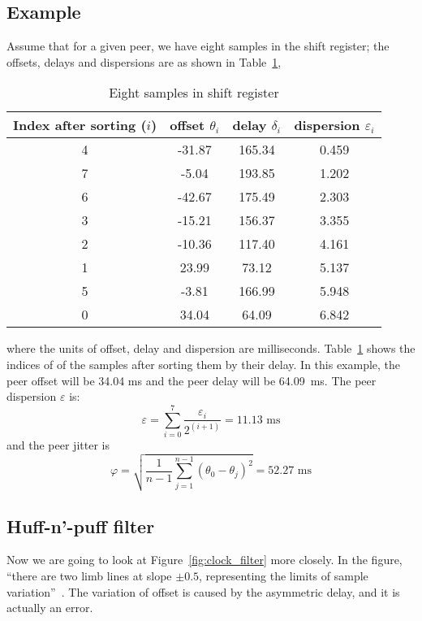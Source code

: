 \subsection{Example}%
\label{sub:example}
Assume that for a given peer, we have eight samples in the shift register; the
offsets, delays and dispersions are as shown in Table~\ref{tab:clock_filter},
\begin{table}[htpb]
    \centering
    \caption{Eight samples in shift register}
    \label{tab:clock_filter}
    \begin{tabular}{|c|c|c|c|}
        \hline
        Index after sorting ($i$) & offset $\theta_i$ & delay $\delta_i$ 
        & dispersion $\varepsilon_i$ \\
        \hline
        4& -31.87&  165.34&  0.459\\
        \hline
        7&  -5.04&  193.85&  1.202\\
        \hline
        6& -42.67&  175.49&  2.303\\
        \hline
        3& -15.21&  156.37&  3.355\\
        \hline
        2& -10.36&  117.40&  4.161\\
        \hline
        1&  23.99&   73.12&  5.137\\
        \hline
        5&  -3.81&  166.99&  5.948\\
        \hline
        0&  34.04&   64.09&  6.842\\
        \hline
    \end{tabular}
\end{table}
where the units of offset, delay and dispersion are milliseconds.
Table~\ref{tab:clock_filter} shows the indices of of the samples after sorting
them by their delay. In this example, the peer offset will be 34.04 ms and the
peer delay will be 64.09~ms. The peer dispersion $\varepsilon$ is:
$$ \varepsilon = \sum^{7}_{i=0} \frac{\varepsilon_i}{2^{(i+1)}} = 11.13
\text{ ms} $$
and the peer jitter is 
$$
    \varphi = \sqrt{\frac{1}{n-1} \sum^{n-1}_{j=1} (\theta_0 - \theta_j)^2}
    = 52.27 \text{ ms}
$$

\subsection{Huff-n'-puff filter}%
\label{sub:huff_n_puff_filter}
Now we are going to look at Figure~\ref{fig:clock_filter} more closely. In the
figure, ``there are two limb lines at slope $\pm0.5$, representing the
limits of sample variation''~\cite{clock_filter}.
The variation of offset is caused by the asymmetric delay, and it is actually
an error.

